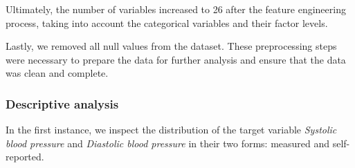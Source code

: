 \documentclass[12 pt]{scrartcl}
\numberwithin{equation}{section}
\begin{document}
Ultimately, the number of variables increased to 26 after the feature engineering process, 
taking into account the categorical variables and their factor levels.

Lastly, we removed all null values from the dataset. These preprocessing steps were necessary to prepare the data for further analysis and ensure that the data was clean and complete.
    
\subsubsection*{Descriptive analysis}

In the first instance, we inspect the distribution of the target variable \textit{Systolic blood pressure} and \textit{Diastolic blood pressure} in
their two forms: measured and self-reported. 
\end{document}
